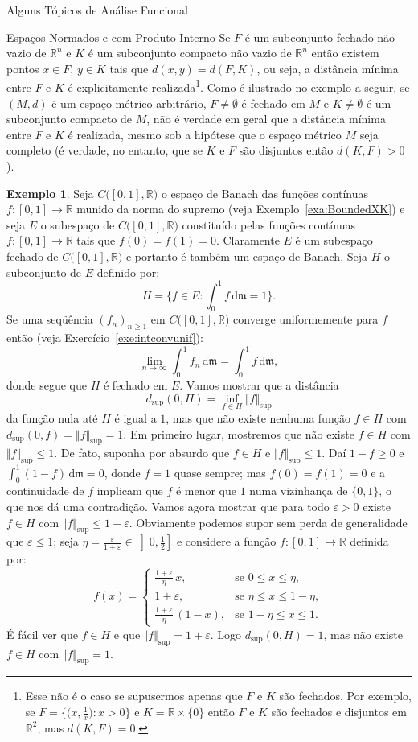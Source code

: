 \documentclass[oneside,final,11pt]{amsbook}
\newcommand{\R}{\mathds R}
\newcommand{\leb}{\mathfrak m}
\newcommand{\dd}{\mathrm d}
\newcommand{\Sup}{\mathrm{sup}}
\theoremstyle{remark}\newtheorem{exercise}{Exercício}[chapter]
\theoremstyle{remark}\newtheorem{*exercise}[exercise]{\hbox to 0pt{\hskip 0pt minus 1fil*}Exercício}
\theoremstyle{definition}\newtheorem{exdefin}{Definição}[chapter]
\theoremstyle{plain}\newtheorem{teo}{Teorema}[section]
\theoremstyle{plain}\newtheorem{lem}[teo]{Lema}
\theoremstyle{plain}\newtheorem{prop}[teo]{Proposição}
\theoremstyle{plain}\newtheorem{cor}[teo]{Corolário}
\theoremstyle{definition}\newtheorem{defin}[teo]{Definição}
\theoremstyle{remark}\newtheorem{rem}[teo]{Observação}
\theoremstyle{definition}\newtheorem{notation}[teo]{Notação}
\theoremstyle{definition}\newtheorem{convention}[teo]{Convenção}
\theoremstyle{definition}\newtheorem{example}[teo]{Exemplo}
\numberwithin{section}{chapter}
\numberwithin{equation}{section}
\begin{document}
\begin{chapter}{Alguns Tópicos de Análise Funcional}
\begin{section}{Espaços Normados e com Produto Interno}
Se $F$ é um subconjunto fechado não vazio de $\R^n$ e $K$ é um subconjunto compacto não vazio de $\R^n$ então
existem pontos $x\in F$, $y\in K$ tais que $d(x,y)=d(F,K)$, ou seja, a distância mínima entre $F$ e $K$ é explicitamente
realizada\footnote{%
Esse não é o caso se supusermos apenas que $F$ e $K$ são fechados. Por exemplo, se $F=\big\{\big(x,\frac1x\big):x>0\big\}$
e $K=\R\times\{0\}$ então $F$ e $K$ são fechados e disjuntos em $\R^2$, mas $d(K,F)=0$.}.
Como é ilustrado no exemplo a seguir, se $(M,d)$ é um espaço métrico arbitrário, $F\ne\emptyset$ é fechado em $M$
e $K\ne\emptyset$ é um subconjunto compacto de $M$,
não é verdade em geral que a distância mínima entre $F$ e $K$ é realizada, mesmo sob a hipótese que o espaço métrico
$M$ seja completo (é verdade, no entanto, que se $K$ e $F$ são disjuntos então $d(K,F)>0$).

\begin{example}
Seja $C\big([0,1],\R\big)$ o espaço de Banach das funções con\-tí\-nuas $f:[0,1]\to\R$ munido da norma do supremo
(veja Exemplo~\ref{exa:BoundedXK}) e seja $E$ o subespaço de $C\big([0,1],\R\big)$ constituído pelas funções
contínuas $f:[0,1]\to\R$ tais que $f(0)=f(1)=0$. Claramente $E$ é um subespaço fechado de $C\big([0,1],\R\big)$ e
portanto é também um espaço de Banach. Seja $H$ o subconjunto de $E$ definido por:
\[H=\big\{f\in E:{\textstyle\int_0^1f\,\dd\leb=1}\big\}.\]
Se uma seqüência $(f_n)_{n\ge1}$ em $C\big([0,1],\R\big)$ converge uniformemente para $f$ então (veja Exercício~\ref{exe:intconvunif}):
\[\lim_{n\to\infty}\int_0^1f_n\,\dd\leb=\int_0^1f\,\dd\leb,\]
donde segue que $H$ é fechado em $E$. Vamos mostrar que a distância
\[d_\Sup(0,H)=\inf_{f\in H}\Vert f\Vert_\Sup\]
da função nula até $H$ é igual a $1$,
mas que não existe nenhuma função $f\in H$ com $d_\Sup(0,f)=\Vert f\Vert_\Sup=1$. Em primeiro lugar, mostremos que não existe
$f\in H$ com $\Vert f\Vert_\Sup\le1$. De fato, suponha por absurdo que $f\in H$ e $\Vert f\Vert_\Sup\le1$. Daí
$1-f\ge0$ e $\int_0^1(1-f)\,\dd\leb=0$, donde $f=1$ quase sempre; mas $f(0)=f(1)=0$ e a continuidade de $f$ implicam
que $f$ é menor que $1$ numa vizinhança de $\{0,1\}$, o que nos dá uma contradição. Vamos agora mostrar que para todo
$\varepsilon>0$ existe $f\in H$ com $\Vert f\Vert_\Sup\le1+\varepsilon$. Obviamente podemos supor sem perda de generalidade
que $\varepsilon\le1$; seja $\eta=\frac\varepsilon{1+\varepsilon}\in\left]0,\frac12\right]$ e considere
a função $f:[0,1]\to\R$ definida por:
\[f(x)=\begin{cases}
\frac{1+\varepsilon}\eta\,x,&\text{se $0\le x\le\eta$},\\
1+\varepsilon,&\text{se $\eta\le x\le1-\eta$},\\
\frac{1+\varepsilon}\eta\,(1-x),&\text{se $1-\eta\le x\le1$}.
\end{cases}\]
É fácil ver que $f\in H$ e que $\Vert f\Vert_\Sup=1+\varepsilon$. Logo $d_\Sup(0,H)=1$,
mas não existe $f\in H$ com $\Vert f\Vert_\Sup=1$.
\end{example}


\end{section}
\end{chapter}
\end{document}
